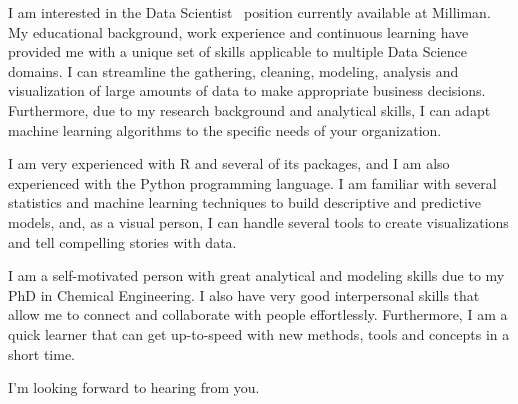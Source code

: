 \documentclass[11pt, letterpaper]{awesome-cv}
\newcommand{\openPosition}{Data Scientist}
\newcommand{\company}{Milliman}
\begin{document}
\makecvheader[R]


\makelettertitle

\begin{cvletter}

I am interested in the \openPosition~ position currently available at \company. My educational background, work experience and continuous learning have provided me with a unique set of skills applicable to multiple Data Science domains. I can streamline the gathering, cleaning, modeling, analysis and visualization of large amounts of data to make appropriate business decisions. Furthermore, due to my research background and analytical skills, I can adapt machine learning algorithms to the specific needs of your organization.


I am very experienced with R and several of its packages, and I am also experienced with the Python programming language. I am familiar with several statistics and machine learning techniques to build descriptive and predictive models, and, as a visual person, I can handle several tools to create visualizations and tell compelling stories with data.

I am a self-motivated person with great analytical and modeling skills due to my PhD in Chemical Engineering. I also have very good interpersonal skills that allow me to connect and collaborate with people effortlessly. Furthermore, I am a quick learner that can get up-to-speed with new methods, tools and concepts in a short time.

I'm looking forward to hearing from you.


\end{cvletter}


\makeletterclosing
\end{document}
